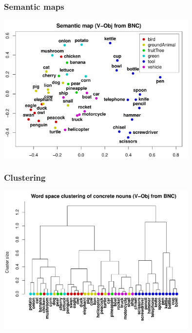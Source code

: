 \begin{frame}[c]
  \frametitle{Semantic maps}

  \begin{center}
    \includegraphics[width=100mm]{img/hieroglyph_semantic_map}
  \end{center}
\end{frame}

\begin{frame}[c]
  \frametitle{Clustering}

  \begin{center}
    \includegraphics[width=100mm]{img/hieroglyph_clustering}
  \end{center}
\end{frame}

